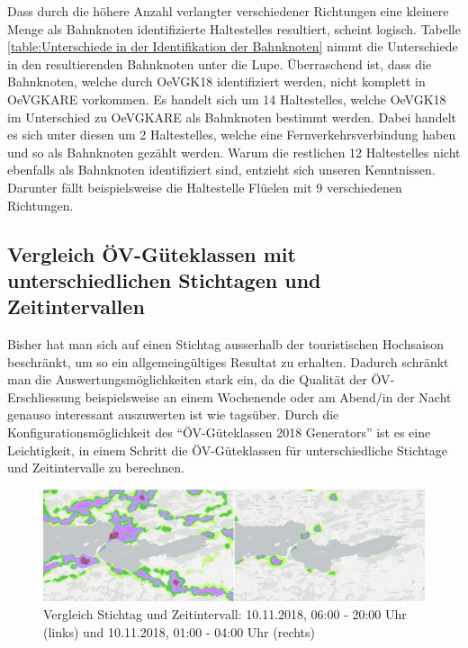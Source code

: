 Dass durch die höhere Anzahl verlangter verschiedener Richtungen eine kleinere Menge als Bahnknoten identifizierte \glspl{Haltestelle} resultiert, scheint logisch.
Tabelle \ref{table:Unterschiede in der Identifikation der Bahnknoten} nimmt die Unterschiede in den resultierenden Bahnknoten unter die Lupe.
Überraschend ist, dass die Bahnknoten, welche durch \gls{OeVGK18} identifiziert werden, nicht komplett in \gls{OeVGKARE} vorkommen.
Es handelt sich um 14 \glspl{Haltestelle}, welche \gls{OeVGK18} im Unterschied zu \gls{OeVGKARE} als Bahnknoten bestimmt werden.
Dabei handelt es sich unter diesen um 2 \glspl{Haltestelle}, welche eine Fernverkehrsverbindung haben und so als Bahnknoten gezählt werden.
Warum die restlichen 12 \glspl{Haltestelle} nicht ebenfalls als Bahnknoten identifiziert sind, entzieht sich unseren Kenntnissen.
Darunter fällt beispielsweise die Haltestelle Flüelen mit 9 verschiedenen Richtungen.

\subsection{Vergleich ÖV-Güteklassen mit unterschiedlichen Stichtagen und Zeitintervallen}
\label{Resultate:Vergleich ÖV-Güteklassen mit unterschiedlichen Stichtagen und Zeitintervallen}

Bisher hat man sich auf einen Stichtag ausserhalb der touristischen Hochsaison beschränkt, um so ein allgemeingültiges Resultat zu erhalten.
Dadurch schränkt man die Auswertungsmöglichkeiten stark ein, da die Qualität der \acs{ÖV}-Erschliessung beispielsweise an einem Wochenende oder am Abend/in der Nacht genauso interessant auszuwerten ist wie tagsüber.
Durch die Konfigurationsmöglichkeit des "`\gls{ÖV-Güteklassen} 2018 Generators"' ist es eine Leichtigkeit, in einem Schritt die \gls{ÖV-Güteklassen} für unterschiedliche Stichtage und Zeitintervalle zu berechnen.

\begin{figure}[ht]
    \centering
    \includegraphics[width=1.0\linewidth]{technicalreport/img/due_date_comparison.png}
    \caption[Vergleich Stichtag und Zeitintervall]{Vergleich Stichtag und Zeitintervall: 10.11.2018, 06:00 - 20:00 Uhr (links) und 10.11.2018, 01:00 - 04:00 Uhr (rechts)}
    \label{fig:due_date_comparison}
\end{figure}

